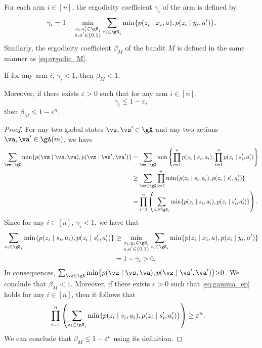 \begin{thm}
    For each arm $i\in[n]$, the ergodicity coefficient $\gamma_i$ of the arm is defined by
    \begin{align*}
        \gamma_i = 1-\min_{\substack{s_i,s'_i\in\gS_i \\a,a'\in\{0,1\}}} \sum_{z_i\in\gS_i} \min\{p(z_i \mid x_i, a), p(z_i \mid y_i, a')\}.
    \end{align*}
    Similarly, the ergodicity coefficient $\beta_M$ of the bandit $M$ is defined in the same manner as \eqref{eq:ergodic_M}.

    If for any arm $i$, $\gamma_i<1$, then $\beta_M<1$.

    Moreover, if there exists $\varepsilon>0$ such that for any arm $i\in[n]$,
    \begin{equation}
        \label{eq:gamma_ep}
        \gamma_i \le 1-\varepsilon,
    \end{equation}
    then $\beta_M \le 1-\varepsilon^n$.
    \label{thm:ergodicity_coeff}
\end{thm}
\begin{proof}
    For any two global states $\vs,\vs'\in\gX$ and any two actions $\va,\va'\in\gA(m)$, we have
    \begin{align*}
        \sum_{\vz\in\gX} \min\{p(\vz \mid \vs, \va), p(\vz \mid \vs', \va')\}
        &= \sum_{\vz\in\gX} \min\left\{\prod_{i=1}^np(z_i \mid s_i, a_i), \prod_{i=1}^np(z_i \mid s'_i, a'_i)\right\} \\
        &\ge \sum_{\vz\in\gX}\prod_{i=1}^n \min\{p(z_i \mid s_i, a_i), p(z_i \mid s'_i, a'_i)\} \\
        &= \prod_{i=1}^n \left(\sum_{z_i\in\gS_i} \min\{p(z_i \mid s_i, a_i), p(z_i \mid s'_i, a'_i)\}\right).
    \end{align*}
    Since for any $i\in[n]$, $\gamma_i<1$, we have that
    \begin{align*}
        \sum_{z_i\in\gS_i} \min\{p(z_i \mid s_i, a_i), p(z_i \mid s'_i, a'_i)\}
        &\ge \min_{\substack{x_i,y_i\in\gS_i \\a,a'\in\{0,1\}}} \sum_{z_i\in\gS_i} \min\{p(z_i \mid x_i, a), p(z_i \mid y_i, a')\} \\
        &= 1-\gamma_i >0.
    \end{align*}
    In consequences, ${\sum_{\vz\in\gX} \min\{p(\vz \mid \vs, \va), p(\vz \mid \vs', \va')\}{>}0}$.
    We conclude that $\beta_M{<}1$.
    \smallskip
    Moreover, if there exists $\varepsilon>0$ such that \eqref{eq:gamma_ep} holds for any $i\in[n]$, then it follows that
    \begin{align*}
        \prod_{i=1}^n \left(\sum_{z_i\in\gS_i} \min\{p(z_i \mid s_i, a_i), p(z_i \mid s'_i, a'_i)\}\right)
        &\ge \varepsilon^n.
    \end{align*}
    We can conclude that $\beta_M\le 1-\varepsilon^n$ using its definition.
\end{proof}

